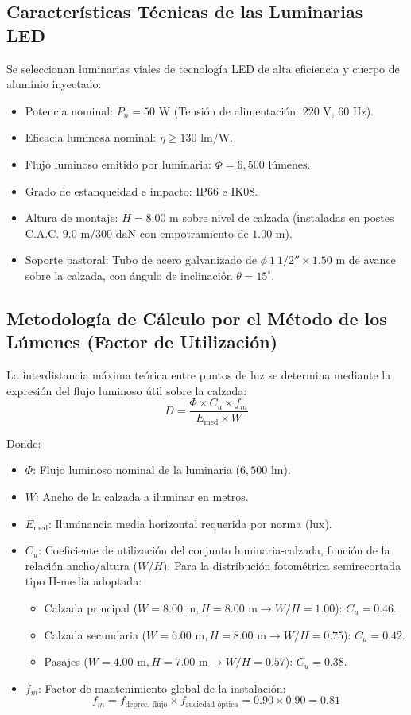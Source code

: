 \subsection{Características Técnicas de las Luminarias LED}
Se seleccionan luminarias viales de tecnología LED de alta eficiencia y cuerpo de aluminio inyectado:
\begin{itemize}
    \item Potencia nominal: $P_n = 50\text{ W}$ (Tensión de alimentación: $220\text{ V}$, $60\text{ Hz}$).
    \item Eficacia luminosa nominal: $\eta \ge 130\text{ lm/W}$.
    \item Flujo luminoso emitido por luminaria: $\Phi = 6,500\text{ lúmenes}$.
    \item Grado de estanqueidad e impacto: IP66 e IK08.
    \item Altura de montaje: $H = 8.00\text{ m}$ sobre nivel de calzada (instaladas en postes C.A.C. $9.0\text{ m}/300\text{ daN}$ con empotramiento de $1.00\text{ m}$).
    \item Soporte pastoral: Tubo de acero galvanizado de $\phi\ 1\ 1/2'' \times 1.50\text{ m}$ de avance sobre la calzada, con ángulo de inclinación $\theta = 15^\circ$.
\end{itemize}

\subsection{Metodología de Cálculo por el Método de los Lúmenes (Factor de Utilización)}
La interdistancia máxima teórica entre puntos de luz se determina mediante la expresión del flujo luminoso útil sobre la calzada:
$$D = \frac{\Phi \times C_u \times f_m}{E_{\text{med}} \times W}$$

Donde:
\begin{itemize}
    \item $\Phi$: Flujo luminoso nominal de la luminaria ($6,500\text{ lm}$).
    \item $W$: Ancho de la calzada a iluminar en metros.
    \item $E_{\text{med}}$: Iluminancia media horizontal requerida por norma (lux).
    \item $C_u$: Coeficiente de utilización del conjunto luminaria-calzada, función de la relación ancho/altura ($W/H$). Para la distribución fotométrica semirecortada tipo II-media adoptada:
      \begin{itemize}
          \item Calzada principal ($W = 8.00\text{ m}, H = 8.00\text{ m} \rightarrow W/H = 1.00$): $C_u = 0.46$.
          \item Calzada secundaria ($W = 6.00\text{ m}, H = 8.00\text{ m} \rightarrow W/H = 0.75$): $C_u = 0.42$.
          \item Pasajes ($W = 4.00\text{ m}, H = 7.00\text{ m} \rightarrow W/H = 0.57$): $C_u = 0.38$.
      \end{itemize}
    \item $f_m$: Factor de mantenimiento global de la instalación:
      $$f_m = f_{\text{deprec. flujo}} \times f_{\text{suciedad óptica}} = 0.90 \times 0.90 = \mathbf{0.81}$$
\end{itemize}

